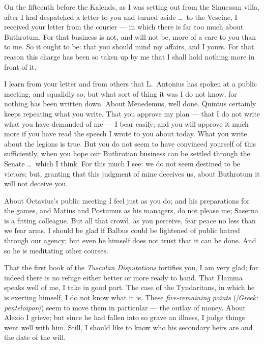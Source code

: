 

 On the fifteenth before the Kalends, as I was setting out from the Sinuessan villa, after I had despatched a letter to you and turned aside \dots\ to the Vescine, I received your letter from the courier --- in which there is far too much about Buthrotum. For that business is not, and will not be, more of a care to you than to me. So it ought to be: that you should mind my affairs, and I yours. For that reason this charge has been so taken up by me that I shall hold nothing more in front of it.

 I learn from your letter and from others that L.~Antonius has spoken at a public meeting, and squalidly so; but what sort of thing it was I do not know, for nothing has been written down. About Menedemus, well done. Quintus certainly keeps repeating what you write. That you approve my plan --- that I do not write what you have demanded of me --- I bear easily; and you will approve it much more if you have read the speech I wrote to you about today. What you write about the legions is true. But you do not seem to have convinced yourself of this sufficiently, when you hope our Buthrotian business can be settled through the Senate \dots\ which I think. For this much I see: we do not seem destined to be victors; but, granting that this judgment of mine deceives us, about Buthrotum it will not deceive you.

 About Octavius's public meeting I feel just as you do; and his preparations for the games, and Matius and Postumus as his managers, do not please me; Saserna is a fitting colleague. But all that crowd, as you perceive, fear peace no less than we fear arms. I should be glad if Balbus could be lightened of public hatred through our agency; but even he himself does not trust that it can be done. And so he is meditating other courses.

 That the first book of the \textit{Tusculan Disputations} fortifies you, I am very glad; for indeed there is no refuge either better or more ready to hand. That Flamma speaks well of me, I take in good part. The case of the Tyndaritans, in which he is exerting himself, I do not know what it is. These \textit{five-remaining points} (\textit{[Greek: pentel\=oipon]}) seem to move them in particular --- the outlay of money. About Alexio I grieve; but since he had fallen into so grave an illness, I judge things went well with him. Still, I should like to know who his secondary heirs are and the date of the will.
